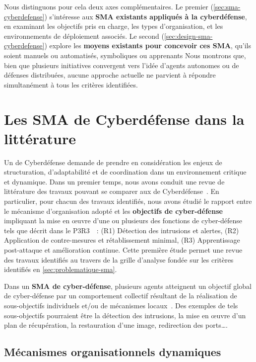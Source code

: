 Nous distinguons pour cela deux axes complémentaires. Le premier (\autoref{sec:sma-cyberdefense}) s’intéresse aux \textbf{SMA existants appliqués à la cyberdéfense}, en examinant les objectifs pris en charge, les types d’organisation, et les environnements de déploiement associés. Le second (\autoref{sec:design-sma-cyberdefense}) explore les \textbf{moyens existants pour concevoir ces SMA}, qu’ils soient manuels ou automatisés, symboliques ou apprenants
%
Nous montrons que, bien que plusieurs initiatives convergent vers l'idée d'agents autonomes ou de défenses distribuées, aucune approche actuelle ne parvient à répondre simultanément à tous les critères identifiées.


\section{Les SMA de Cyberdéfense dans la littérature}\label{sec:sma-cyberdefense}

Un  de Cyberdéfense demande de prendre en considération les enjeux de structuration, d'adaptabilité et de coordination dans un environnement critique et dynamique.
Dans un premier temps, nous avons conduit une revue de littérature des travaux pouvant se comparer aux  de Cyberdéfense~\cite{soule2023ressithese}.
En particulier, pour chacun des travaux identifiés, nous avons étudié le rapport entre le mécanisme d'organisation adopté et les \textbf{objectifs de cyber-défense} impliquant la mise en œuvre d'une ou plusieurs des fonctions de cyber-défense tels que décrit dans le P3R3~\cite{theron_p3r3_2021}~:
(R1) Détection des intrusions et alertes,
(R2) Application de contre-mesures et rétablissement minimal,
(R3) Apprentissage post-attaque et amélioration continue.
Cette première étude permet une revue des travaux identifiés au travers de la grille d'analyse fondée sur les critères identifiés en \autoref{sec:problematique-sma}.

Dans un \textbf{SMA de cyber-défense}, plusieurs agents atteignent un objectif global de cyber-défense par un comportement collectif résultant de la réalisation de sous-objectifs individuels et/ou de mécanismes locaux~\cite{jamont2015meeting}.
Des exemples de tels sous-objectifs pourraient être la détection des intrusions, la mise en œuvre d'un plan de récupération, la restauration d'une image, redirection des ports\dots.



\subsection{Mécanismes organisationnels dynamiques}

